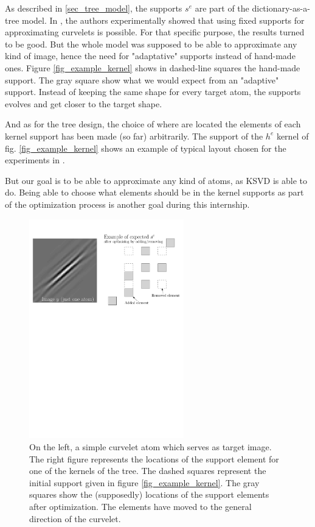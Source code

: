 As described in \ref{sec_tree_model}, the supports $s^e$ are part of the dictionary-as-a-tree model. In \cite{chabiron_toward_2015}, the authors experimentally showed that using fixed supports for approximating curvelets is possible. For that specific purpose, the results turned to be good. But the whole model was supposed to be able to approximate any kind of image, hence the need for "adaptative" supports instead of hand-made ones. Figure \ref{fig_example_kernel} shows in dashed-line squares the hand-made support. The gray square show what we would expect from an "adaptive" support. Instead of keeping the same shape for every target atom, the supports evolves and get closer to the target shape.

And as for the tree design, the choice of where are located the elements of each kernel support has been made (so far) arbitrarily. The support of the $h^e$ kernel of fig. \ref{fig_example_kernel} shows an example of typical layout chosen for the experiments in \cite{chabiron_optimization_2016}. 

But our goal is to be able to approximate any kind of atoms, as \ac{KSVD} is able to do. Being able to choose what elements should be in the kernel supports as part of the optimization process is another goal during this internship.

\begin{figure}[!ht] \centering
\includegraphics[width=0.6\textwidth]{figures/add-rm-elmts-support.pdf}
\caption{On the left, a simple curvelet atom which serves as target image. The right figure represents the locations of the support element for one of the kernels of the tree. The dashed squares represent the initial support given in figure \ref{fig_example_kernel}. The gray squares show the (supposedly) locations of the support elements after optimization. The elements have moved to the general direction of the curvelet.\label{fig_example_optimal_support}}
\end{figure}


